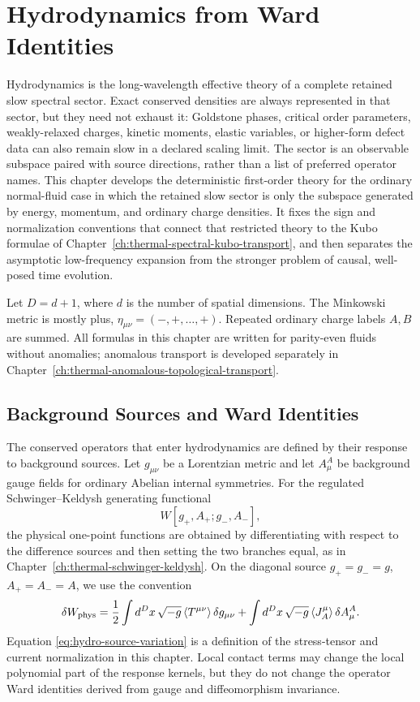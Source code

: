 \chapter{Hydrodynamics from Ward Identities}
\label{ch:thermal-hydrodynamics-from-ward-identities}

\ConventionsLorentzian

Hydrodynamics is the long-wavelength effective theory of a complete retained
slow spectral sector.  Exact conserved densities are always represented in
that sector, but they need not exhaust it: Goldstone phases, critical order
parameters, weakly-relaxed charges, kinetic moments, elastic variables, or
higher-form defect data can also remain slow in a declared scaling limit.  The
sector is an observable subspace paired with source directions, rather than a
list of preferred operator names.  This chapter develops the deterministic
first-order theory
for the ordinary normal-fluid case in which the retained slow sector is only
the subspace generated by energy, momentum, and ordinary charge densities.  It
fixes the sign and normalization conventions that
connect that restricted theory to the Kubo formulae of
Chapter~\ref{ch:thermal-spectral-kubo-transport}, and then separates the
asymptotic low-frequency expansion from the stronger problem of causal,
well-posed time evolution.

Let \(D=d+1\), where \(d\) is the number of spatial dimensions.  The
Minkowski metric is mostly plus, \(\eta_{\mu\nu}=(-,+,\ldots,+)\).  Repeated
ordinary charge labels \(A,B\) are summed.  All formulas in this chapter are
written for parity-even fluids without anomalies; anomalous transport is
developed separately in Chapter~\ref{ch:thermal-anomalous-topological-transport}.

\section{Background Sources and Ward Identities}

The conserved operators that enter hydrodynamics are defined by their
response to background sources.  Let \(g_{\mu\nu}\) be a Lorentzian metric
and let \(A^A_\mu\) be background gauge fields for ordinary Abelian internal
symmetries.  For the regulated Schwinger--Keldysh generating functional
\[
  W[g_+,A_+;g_-,A_-],
\]
the physical one-point functions are obtained by differentiating with
respect to the difference sources and then setting the two branches equal,
as in Chapter~\ref{ch:thermal-schwinger-keldysh}.  On the diagonal source
\(g_+=g_-=g\), \(A_+=A_-=A\), we use the convention
\begin{equation}
  \delta W_{\rm phys}
  =
  \frac12\int d^Dx\,\sqrt{-g}\,
  \langle T^{\mu\nu}\rangle\,\delta g_{\mu\nu}
  +\int d^Dx\,\sqrt{-g}\,
  \langle J_A^\mu\rangle\,\delta A^A_\mu .
  \label{eq:hydro-source-variation}
\end{equation}
Equation \eqref{eq:hydro-source-variation} is a definition of the
stress-tensor and current normalization in this chapter.  Local contact
terms may change the local polynomial part of the response kernels, but they
do not change the operator Ward identities derived from gauge and
diffeomorphism invariance.

